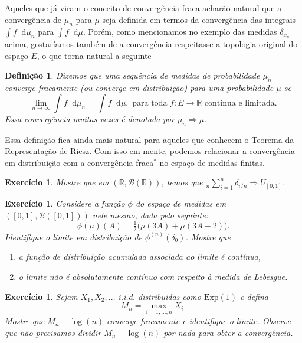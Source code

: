 \documentclass[reqno, draft]{book}
\newcommand*\1{\mathds{1}}
\newtheorem{definition}[theorem]{Definição}
\newtheorem{exercise}[example]{Exercício}
\renewcommand*\d{\mathop{}\!\mathrm{d}}
\begin{document}
Aqueles que já viram o conceito de convergência fraca acharão natural que a convergência de $\mu_n$ para $\mu$ seja definida em termos da convergência das integrais $\int f \d \mu_n$ para $\int f \d \mu$.
Porém, como mencionamos no exemplo das medidas $\delta_{x_n}$ acima, gostaríamos também de a convergência respeitasse a topologia original do espaço $E$, o que torna natural a seguinte

\begin{definition}
  Dizemos que uma sequência de medidas de probabilidade $\mu_n$ converge fracamente (ou converge em distribuição) para uma probabilidade $\mu$ se 
  \begin{equation}
    \lim_{n \to \infty} \int f \d \mu_n = \int f \d \mu, \text{ para toda $f:E \to \mathbb{R}$ contínua e limitada.}
  \end{equation}
  Essa convergência muitas vezes é denotada por $\mu_n \Rightarrow \mu$.
\end{definition}

Essa definição fica ainda mais natural para aqueles que conhecem o Teorema da Representação de Riesz.
Com isso em mente, podemos relacionar a convergência em distribuição com a convergência fraca$^*$ no espaço de medidas finitas.

\begin{exercise}
  Mostre que em $(\mathbb{R}, \mathcal{B}(\mathbb{R}))$, temos que $\tfrac{1}{n} \sum_{i=1}^n \delta_{i/n} \Rightarrow U_{[0,1]}$.
\end{exercise}

\begin{exercise}
  Considere a função $\phi$ do espaço de medidas em $([0,1], \mathcal{B}([0,1]))$ nele mesmo, dada pelo seguinte:
  \begin{equation}
    \phi(\mu)(A) = \tfrac{1}{2} \big( \mu(3A) + \mu(3A - 2) \big).
  \end{equation}
  Identifique o limite em distribuição de $\phi^{(n)}(\delta_0)$.
  Mostre que
  \begin{enumerate}[\quad a)]
  \item a função de distribuição acumulada associada ao limite é contínua,
  \item o limite não é absolutamente contínuo com respeito à medida de Lebesgue.
  \end{enumerate}
\end{exercise}

\begin{exercise}
  Sejam $X_1, X_2, \dots$ i.i.d. distribuidas como $\text{Exp}(1)$ e defina
  \begin{equation}
    M_n = \max_{i = 1, \dots, n} X_i.
  \end{equation}
  Mostre que $M_n - \log(n)$ converge fracamente e identifique o limite.
  Observe que não precisamos dividir $M_n - \log(n)$ por nada para obter a convergência.
\end{exercise}
\end{document}
